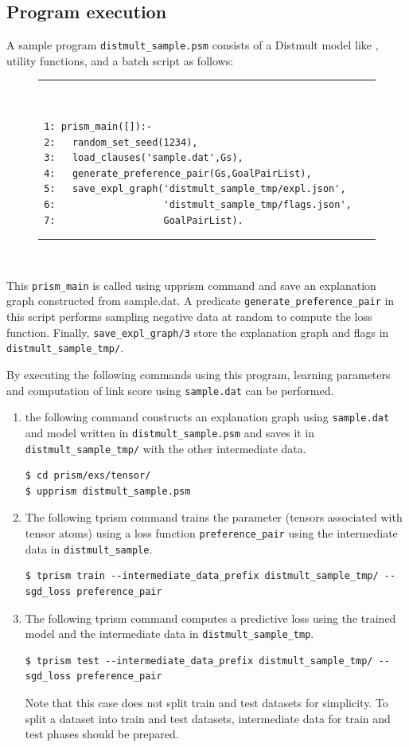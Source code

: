 \documentclass[a4paper]{report}
\begin{document}
\subsection*{Program execution}
A sample program \verb|distmult_sample.psm| consists of a Distmult model like , utility functions, and a batch script as follows: 
\begin{figure}[h]
	\rule{0.85\textwidth}{0.10mm}\\ [-1em]
\begin{verbatim}
 1: prism_main([]):-
 2:   random_set_seed(1234),
 3:   load_clauses('sample.dat',Gs),
 4:   generate_preference_pair(Gs,GoalPairList),
 5:   save_expl_graph('distmult_sample_tmp/expl.json',
 6:                   'distmult_sample_tmp/flags.json',
 7:                   GoalPairList).
\end{verbatim}
\rule{0.85\textwidth}{0.10mm}\\ [-1em]
\end{figure}
This \verb|prism_main| is called using upprism command and save an explanation graph constructed from sample.dat.
A predicate \verb|generate_preference_pair| in this script performs sampling negative data at random to compute the loss function.
Finally, \verb|save_expl_graph/3| store the explanation graph and flags in \verb|distmult_sample_tmp/|.

By executing the following commands using this program, learning parameters and computation of link score using {\tt sample.dat} can be performed.
\begin{enumerate}
\item the following command constructs an explanation graph using {\tt sample.dat} and model written in {\tt distmult\_sample.psm} and saves it in \verb|distmult_sample_tmp/| with the other intermediate data.
\begin{verbatim}
$ cd prism/exs/tensor/
$ upprism distmult_sample.psm
\end{verbatim}
	
\item The following tprism command trains the parameter (tensors associated with tensor atoms) using a loss function {\tt preference\_pair} using the intermediate data in {\tt distmult\_sample}.
\begin{verbatim}
$ tprism train --intermediate_data_prefix distmult_sample_tmp/ --sgd_loss preference_pair
\end{verbatim}

\item The following tprism command computes a predictive loss using the trained model and the intermediate data in {\tt distmult\_sample\_tmp}.
\begin{verbatim}
$ tprism test --intermediate_data_prefix distmult_sample_tmp/ --sgd_loss preference_pair
\end{verbatim}
Note that this case does not split train and test datasets for simplicity.
To split a dataset into train and test datasets, intermediate data for train and test phases should be prepared.
\end{enumerate}
\end{document}
